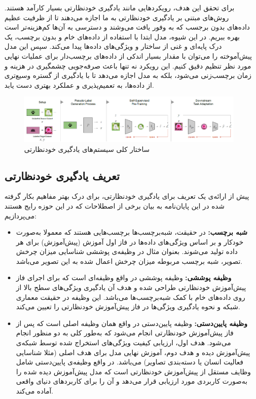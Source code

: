 برای تحقق این هدف، رویکردهایی مانند یادگیری خودنظارتی بسیار کارآمد هستند. روش‌های مبتنی بر یادگیری خودنظارتی به ما اجازه می‌دهند تا از ظرفیت عظیم داده‌های بدون برجسب که به وفور یافت می‌وشند و دسترسی به آن‌ها کم‌هزینه‌تر است بهره ببریم. در این شیوه، مدل ابتدا با استفاده از داده‌های خام و بدون برچسب، یک درک پایه‌ای و غنی از ساختار و ویژگی‌های داده‌ها پیدا می‌کند. سپس این مدل پیش‌آموخته را می‌توان با مقدار بسیار اندکی از داده‌های برچسب‌دار برای عملیات نهایی مورد نظر تنظیم دقیق کنیم. این رویکرد نه تنها باعث صرفه‌جویی چشمگیری در هزینه و زمان برچسب‌زنی می‌شود، بلکه به مدل اجازه می‌دهد تا با یادگیری از گستره وسیع‌تری از داده‌ها، به تعمیم‌پذیری و عملکرد بهتری دست یابد.

\begin{figure}[htbp]
  \centering
  \includegraphics[width=1.0\textwidth]{Images/Chapter2/selfsupervised-overview.png}
  \caption{ساختار کلی سیستم‌های یادگیری خودنظارتی}
  \label{fig:selfsupervised-overview}
\end{figure}

\subsection{تعریف یادگیری خودنظارتی}

پیش از ارائه‌ی یک تعریف برای یادگیری خودنظارتی، برای درک بهتر مفاهیم بکار گرفته شده در این پایان‌نامه به بیان برخی از اصطلاحات که در این حوزه رایج هستند می‌پردازیم:

\begin{itemize}
    \item \textbf{شبه برچسب:}
    در حقیقت، شبه‌برچسب‌ها برچسب‌هایی هستند که معمولا به‌صورت خودکار و بر اساس ویژگی‌های داده‌ها در فاز اول آموزش (پیش‌آموزش) برای هر داده تولید می‌شوند. بعنوان مثال در وظیفه‌ی پوششی شناسایی میزان چرخش تصویر، شبه برچسب مربوطه میزان چرخش اعمال شده به این تصویر می‌باشد.
    \item \textbf{وظیفه پوششی:}
    وظیفه پوششی در واقع وظیفه‌ای است که برای اجرای فاز پیش‌آموزش خودنظارتی طراحی شده و هدف آن یادگیری ویژگی‌های سطح بالا از روی داده‌های خام با کمک شبه‌برچسب‌ها می‌باشد. این وظیفه در حقیقت معماری شبکه و نحوه یادگیری ویژگی‌ها در فاز پیش‌آموزش خودنظارتی را تعیین می‌کند.
    \item \textbf{وظیفه پایین‌دستی:}
    وظیفه پایین‌دستی در واقع همان وظیفه اصلی است که پس از فاز پیش‌آموزش خودنظارتی انجام می‌شود که به‌طور کلی به دو منظور انجام می‌شود. هدف اول، ارزیابی کیفیت ویژگی‌های استخراج شده توسط شبکه‌ی پیش‌آموزش دیده و هدف دوم، آموزش نهایی مدل برای هدف اصلی (مثلا شناسایی فعالیت انسان یا دسته‌بندی تصاویر) می‌باشد. در واقع وظیفه‌ی پایین‌دستی شامل وظایف مستقل از پیش‌آموزش خودنظارتی است که مدل پیش‌آموزش دیده شده را به‌صورت کاربردی مورد ارزیابی قرار می‌دهد و آن را برای کاربردهای دنیای واقعی آماده می‌کند.
\end{itemize}

